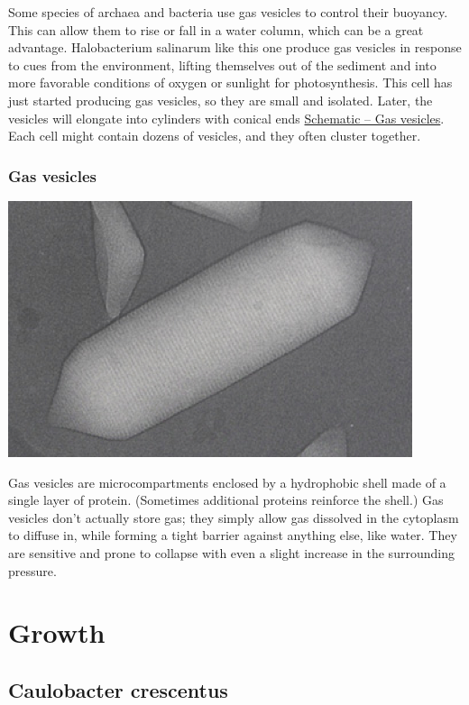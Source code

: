 \documentclass[]{tufte-book}
\begin{document}
Some species of archaea and bacteria use gas vesicles to control their
buoyancy. This can allow them to rise or fall in a water column, which
can be a great advantage. Halobacterium salinarum like this one produce
gas vesicles in response to cues from the environment, lifting
themselves out of the sediment and into more favorable conditions of
oxygen or sunlight for photosynthesis. This cell has just started
producing gas vesicles, so they are small and isolated. Later, the
vesicles will elongate into cylinders with conical ends
\protect\hyperlink{Gas_vesicles}{Schematic -- Gas vesicles}. Each cell
might contain dozens of vesicles, and they often cluster together.

\hypertarget{Gas_vesicles}{\subsection{Gas
vesicles}\label{Gas_vesicles}}

\includegraphics{img/03_schematic/3_7_1_GasVesicle}

Gas vesicles are microcompartments enclosed by a hydrophobic shell made
of a single layer of protein. (Sometimes additional proteins reinforce
the shell.) Gas vesicles don't actually store gas; they simply allow gas
dissolved in the cytoplasm to diffuse in, while forming a tight barrier
against anything else, like water. They are sensitive and prone to
collapse with even a slight increase in the surrounding pressure.

\chapter{Growth}\label{growth}

\section{Caulobacter crescentus}\label{caulobacter-crescentus-2}
\end{document}
